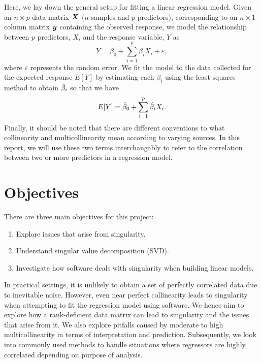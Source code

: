 \documentclass[12pt]{article}
\newcommand{\gbh}{\hat{\gb}}
\begin{document}
	Here, we lay down the general setup for fitting a linear regression model. Given an $n\times p$ data matrix $\boldsymbol{X}$ ($n$ samples and $p$ predictors), corresponding to an $n\times 1$ column matrix $\boldsymbol{y}$ containing the observed response, we model the relationship between $p$ predictors, $X_i$  and the response variable, $Y$ as
	\begin{equation}
		Y=\beta_0+\sum_{i=1}^{p}\beta_i X_i+\varepsilon,
	\end{equation}
	where $\varepsilon$ represents the random error. We fit the model to the data collected for the expected response $E[Y]$ by estimating each $\beta_i$ using the least squares method to obtain $\gbh_i$ so that we have
	\begin{equation}
		E[Y]=\gbh_0+\sum_{i=1}^{p}\gbh_iX_i.
	\end{equation}
	Finally, it should be noted that there are different conventions to what collinearity and multicollinearity mean according to varying sources. In this report, we will use these two terms interchangably to refer to the correlation between two or more predictors in a regression model.
	
	\section{Objectives}
	
	There are three main objectives for this project:
	
	\begin{enumerate}
		\item Explore issues that arise from singularity.
		\item Understand singular value decomposition (SVD).
		\item Investigate how software deals with singularity when building linear models.
	\end{enumerate}
	
	In practical settings, it is unlikely to obtain a set of perfectly correlated data due to inevitable noise. However, even near perfect collinearity leads to singularity when attempting to fit the regression model using software. We hence aim to explore how a rank-deficient data matrix can lead to singularity and the issues that arise from it. We also explore pitfalls caused by moderate to high multicollinearity in terms of interpretation and prediction. Subsequently, we look into commonly used methods to handle situations where regressors are highly correlated depending on purpose of analysis.\\
	
\end{document}
